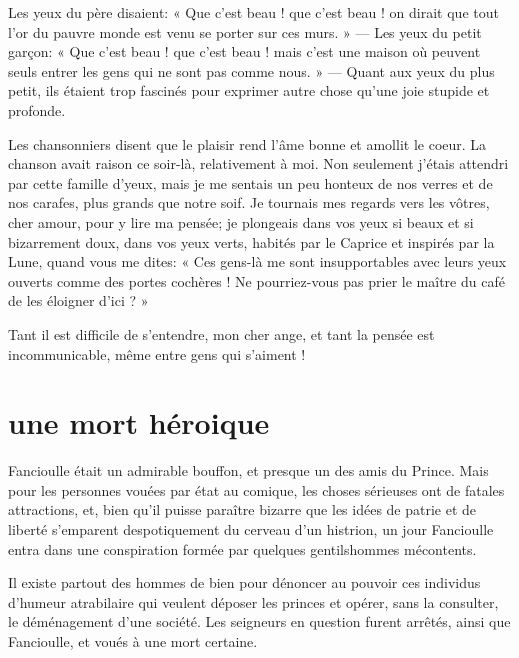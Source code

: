 Les yeux du père disaient: « Que c’est beau ! que
c’est beau ! on dirait que tout l’or
du pauvre monde est venu se porter sur ces murs. » --- Les yeux du petit
garçon: « Que c’est beau ! que c’est
beau ! mais c’est une maison où peuvent seuls entrer
les gens qui ne sont pas comme nous. » --- Quant aux yeux du plus petit, 
ils étaient trop fascinés pour exprimer autre chose 
qu’une joie stupide et profonde.

Les chansonniers disent que le plaisir rend l’âme bonne
et amollit le coeur. La chanson avait raison ce soir{}-là, relativement
à moi. Non seulement j’étais attendri par cette
famille d’yeux, mais je me sentais un peu honteux de
nos verres et de nos carafes, plus grands que notre soif. Je tournais
mes regards vers les vôtres, cher amour, pour y lire ma pensée; je
plongeais dans vos yeux si beaux et si bizarrement doux, dans vos yeux
verts, habités par le Caprice et inspirés par la Lune, quand vous me
dites: « Ces gens{}-là me sont insupportables avec leurs yeux ouverts
comme des portes cochères ! Ne pourriez{}-vous pas prier le maître du
café de les éloigner d’ici ? »

Tant il est difficile de s’entendre, mon cher ange, et
tant la pensée est incommunicable, même entre gens qui
s’aiment !

\quebra\section[Une mort héroique]{une mort héroique }

Fancioulle était un admirable bouffon, et presque un des amis du Prince.
Mais pour les personnes vouées par état au comique, les choses
sérieuses ont de fatales attractions, et, bien qu’il
puisse paraître bizarre que les idées de patrie et de liberté
s’emparent despotiquement du cerveau
d’un histrion, un jour Fancioulle entra dans une
conspiration formée par quelques gentilshommes mécontents.

Il existe partout des hommes de bien pour dénoncer au pouvoir ces
individus d’humeur atrabilaire qui veulent déposer les
princes et opérer, sans la consulter, le déménagement
d’une société. Les seigneurs en question furent
arrêtés, ainsi que Fancioulle, et voués à une mort certaine.

